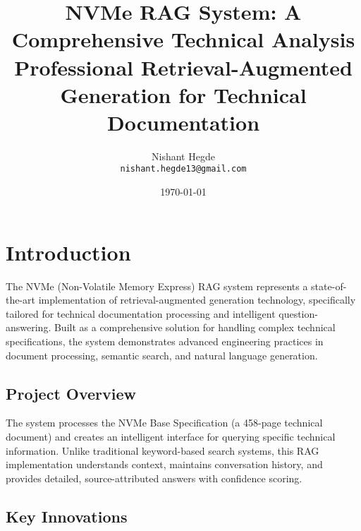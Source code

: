\documentclass[10pt,a4paper,twocolumn]{article}
\title{\textbf{NVMe RAG System: A Comprehensive Technical Analysis} \\
       \normalsize Professional Retrieval-Augmented Generation for Technical Documentation}
\author{Nishant Hegde \\
        \texttt{nishant.hegde13@gmail.com}}
\date{\today}
\begin{document}

\section{Introduction}

The NVMe (Non-Volatile Memory Express) RAG system represents a state-of-the-art implementation of retrieval-augmented generation technology, specifically tailored for technical documentation processing and intelligent question-answering. Built as a comprehensive solution for handling complex technical specifications, the system demonstrates advanced engineering practices in document processing, semantic search, and natural language generation.

\subsection{Project Overview}

The system processes the NVMe Base Specification (a 458-page technical document) and creates an intelligent interface for querying specific technical information. Unlike traditional keyword-based search systems, this RAG implementation understands context, maintains conversation history, and provides detailed, source-attributed answers with confidence scoring.

\subsection{Key Innovations}
\end{document}
